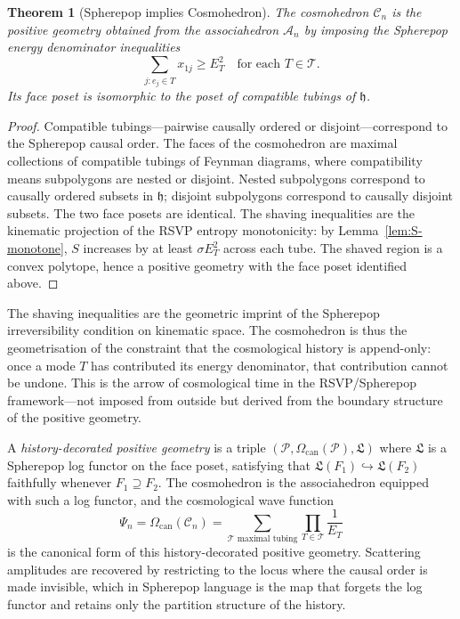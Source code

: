 \documentclass[12pt, oneside]{amsart}
\theoremstyle{plain}
\newtheorem{theorem}{Theorem}[section]
\theoremstyle{definition}
\theoremstyle{remark}
\newcommand{\Sf}{S}
\newcommand{\hist}{\mathfrak{h}}
\newcommand{\Log}{\mathfrak{L}}
\newcommand{\WF}{\Psi}
\newcommand{\Assoc}{\mathcal{A}_n}
\newcommand{\Cosmo}{\mathcal{C}_n}
\newcommand{\CF}{\Omega_{\mathrm{can}}}
\begin{document}
\begin{theorem}[Spherepop implies Cosmohedron]
\label{thm:cosmo}
The cosmohedron $\Cosmo$ is the positive geometry obtained from the associahedron $\Assoc$ by imposing the Spherepop energy denominator inequalities
\[
  \sum_{j: e_j \in T} x_{1j} \geq E_T^2 \quad \text{for each } T \in \mathcal{T}.
\]
Its face poset is isomorphic to the poset of compatible tubings of $\hist$.
\end{theorem}

\begin{proof}
Compatible tubings---pairwise causally ordered or disjoint---correspond to the Spherepop causal order. The faces of the cosmohedron are maximal collections of compatible tubings of Feynman diagrams, where compatibility means subpolygons are nested or disjoint. Nested subpolygons correspond to causally ordered subsets in $\hist$; disjoint subpolygons correspond to causally disjoint subsets. The two face posets are identical. The shaving inequalities are the kinematic projection of the RSVP entropy monotonicity: by Lemma~\ref{lem:S-monotone}, $\Sf$ increases by at least $\sigma E_T^2$ across each tube. The shaved region is a convex polytope, hence a positive geometry with the face poset identified above.
\end{proof}

The shaving inequalities are the geometric imprint of the Spherepop irreversibility condition on kinematic space. The cosmohedron is thus the geometrisation of the constraint that the cosmological history is append-only: once a mode $T$ has contributed its energy denominator, that contribution cannot be undone. This is the arrow of cosmological time in the RSVP/Spherepop framework---not imposed from outside but derived from the boundary structure of the positive geometry.

A \emph{history-decorated positive geometry} is a triple $(\mathcal{P}, \CF(\mathcal{P}), \Log)$ where $\Log$ is a Spherepop log functor on the face poset, satisfying that $\Log(F_1) \hookrightarrow \Log(F_2)$ faithfully whenever $F_1 \supseteq F_2$. The cosmohedron is the associahedron equipped with such a log functor, and the cosmological wave function
\[
  \WF_n = \CF(\Cosmo) = \sum_{\mathcal{T}\text{ maximal tubing}} \prod_{T \in \mathcal{T}} \frac{1}{E_T}
\]
is the canonical form of this history-decorated positive geometry. Scattering amplitudes are recovered by restricting to the locus where the causal order is made invisible, which in Spherepop language is the map that forgets the log functor and retains only the partition structure of the history.
\end{document}
